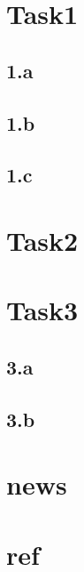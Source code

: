 \documentclass[12pt]{article}
\begin{document}

\pagestyle{fancy}
\fancyhf{}
\setlength{\headheight}{32.09pt}

\tableofcontents
\newpage

\section{Task1}
\subsection{1.a}

\subsection{1.b}

\subsection{1.c}


\section{Task2}


\section{Task3}
\subsection{3.a}

\subsection{3.b}


\section{news}


\section{ref}

\end{document}
